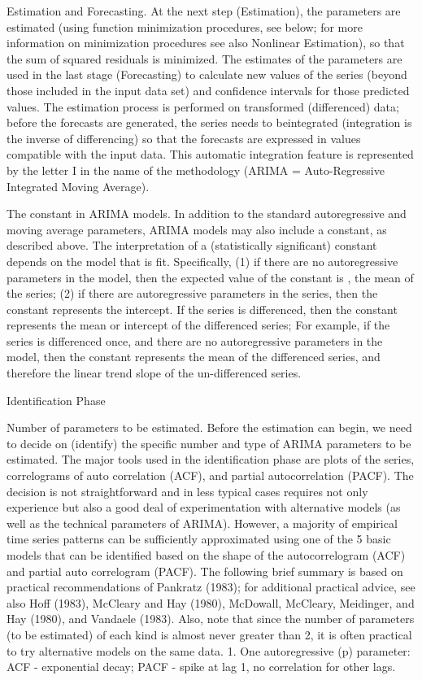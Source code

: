 Estimation and Forecasting. At the next step (Estimation), the parameters are estimated (using function minimization procedures, see below; for more information on minimization procedures see also Nonlinear Estimation), so that the sum of squared residuals is minimized. The estimates of the parameters are used in the last stage (Forecasting) to calculate new values of the series (beyond those included in the input data set) and confidence intervals for those predicted values. The estimation process is performed on transformed (differenced) data; before the forecasts are generated, the series needs to beintegrated (integration is the inverse of differencing) so that the forecasts are expressed in values compatible with the input data. This automatic integration feature is represented by the letter I in the name of the methodology (ARIMA = Auto-Regressive Integrated Moving Average).

The constant in ARIMA models. In addition to the standard autoregressive and moving average parameters, ARIMA models may also include a constant, as described above. The interpretation of a (statistically significant) constant depends on the model that is fit. Specifically, (1) if there are no autoregressive parameters in the model, then the expected value of the constant is , the mean of the series; (2) if there are autoregressive parameters in the series, then the constant represents the intercept. If the series is differenced, then the constant represents the mean or intercept of the differenced series; For example, if the series is differenced once, and there are no autoregressive parameters in the model, then the constant represents the mean of the differenced series, and therefore the linear trend slope of the un-differenced series.

Identification Phase

Number of parameters to be estimated. Before the estimation can begin, we need to decide on (identify) the specific number and type of ARIMA parameters to be estimated. The major tools used in the identification phase are plots of the series, correlograms of auto correlation (ACF), and partial autocorrelation (PACF). The decision is not straightforward and in less typical cases requires not only experience but also a good deal of experimentation with alternative models (as well as the technical parameters of ARIMA). However, a majority of empirical time series patterns can be sufficiently approximated using one of the 5 basic models that can be identified based on the shape of the autocorrelogram (ACF) and partial auto correlogram (PACF). The following brief summary is based on practical recommendations of Pankratz (1983); for additional practical advice, see also Hoff (1983), McCleary and Hay (1980), McDowall, McCleary, Meidinger, and Hay (1980), and Vandaele (1983). Also, note that since the number of parameters (to be estimated) of each kind is almost never greater than 2, it is often practical to try alternative models on the same data.
1.
One autoregressive (p) parameter: ACF - exponential decay; PACF - spike at lag 1, no correlation for other lags.

